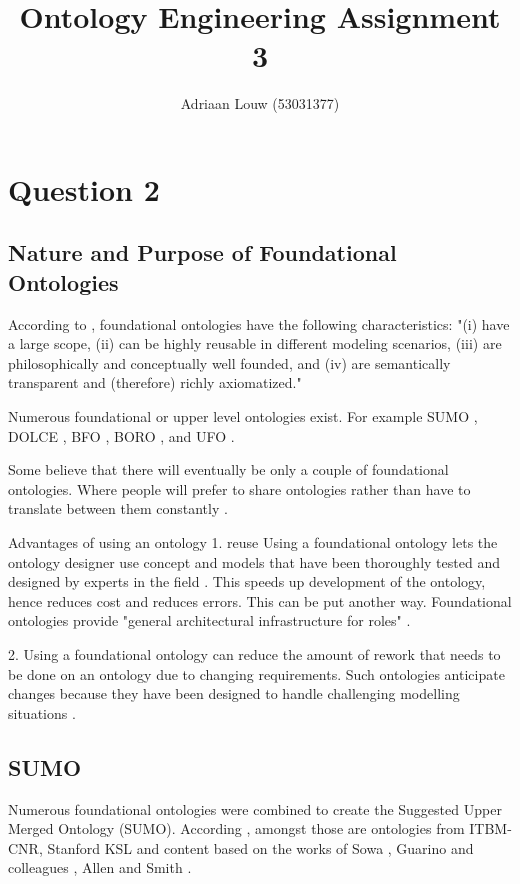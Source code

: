 \documentclass[12pt,a4paper]{article}
\title{Ontology Engineering Assignment 3}
\author{Adriaan Louw (53031377)}
\begin{document}
\section{Question 2}

\subsection{Nature and Purpose of Foundational Ontologies}

According to \cite{dolce}, foundational ontologies have the following characteristics: "(i) have a large scope, (ii) can be highly reusable in different modeling scenarios, (iii) are philosophically and conceptually well founded, and (iv) are semantically transparent and (therefore) richly axiomatized."

Numerous foundational or upper level ontologies exist. For example
SUMO \citep{sumo},
DOLCE \citep{dolce},
BFO \citep{BFO},
BORO \citep{DeCesare},
and UFO \citep{DeCesare}.

Some believe that there will eventually be only a couple of foundational ontologies. Where people will prefer to share ontologies rather than have to translate between them constantly \citep{sumo}.

Advantages of using an ontology
1. reuse 
Using a foundational ontology lets the ontology designer use concept and models that have been thoroughly tested and designed by experts in the field \citep{sumo}. This speeds up development of the ontology, hence reduces cost and reduces errors. This can be put another way. Foundational ontologies provide "general architectural infrastructure for roles" \citep{DeCesare}.

2. Using a foundational ontology can reduce the amount of rework that needs to be done on an ontology due to changing requirements. Such ontologies anticipate changes because they have been designed to handle challenging modelling situations \citep{sumo}.



\subsection{SUMO}
\citep{sumo}

Numerous foundational ontologies were combined to create the Suggested Upper Merged Ontology (SUMO)\citep{sumo}. According \cite{sumo}, amongst those are ontologies from ITBM-CNR, Stanford KSL and content based on the works of Sowa \citep{sowa}, Guarino and colleagues \citep{borgo1996pointless}, Allen \citep{J.F.Allen1984} and Smith \citep{Smith1996}.
\end{document}
